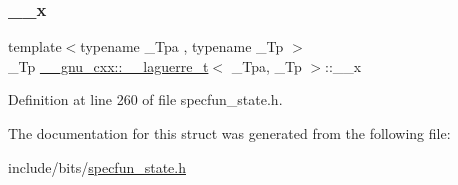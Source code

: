 \subsubsection{\texorpdfstring{\+\_\+\+\_\+x}{\_\_x}}
{\footnotesize\ttfamily template$<$typename \+\_\+\+Tpa , typename \+\_\+\+Tp $>$ \\
\+\_\+\+Tp \hyperlink{struct____gnu__cxx_1_1____laguerre__t}{\+\_\+\+\_\+gnu\+\_\+cxx\+::\+\_\+\+\_\+laguerre\+\_\+t}$<$ \+\_\+\+Tpa, \+\_\+\+Tp $>$\+::\+\_\+\+\_\+x}



Definition at line 260 of file specfun\+\_\+state.\+h.



The documentation for this struct was generated from the following file\+:\begin{DoxyCompactItemize}
\item 
include/bits/\hyperlink{specfun__state_8h}{specfun\+\_\+state.\+h}\end{DoxyCompactItemize}
